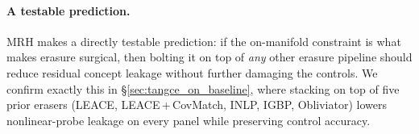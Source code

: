 \paragraph{A testable prediction.}
MRH makes a directly testable prediction: if the on-manifold constraint is what makes erasure surgical, then bolting it on top of \emph{any} other erasure pipeline should reduce residual concept leakage without further damaging the controls. We confirm exactly this in §\ref{sec:tangce_on_baseline}, where stacking \TanGCE{} on top of five prior erasers (LEACE, LEACE\,+\,CovMatch, INLP, IGBP, Obliviator) lowers nonlinear-probe leakage on every panel while preserving control accuracy.
